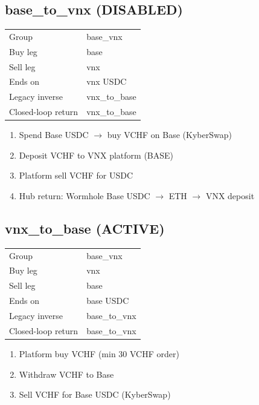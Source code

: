 \documentclass[11pt,a4paper]{article}
\begin{document}
\subsection*{\textcolor{warnred}{base\_to\_vnx} (DISABLED)}
\begin{tabular}{@{}ll@{}}
Group & base\_vnx \\
Buy leg & base \\
Sell leg & vnx \\
Ends on & vnx USDC \\
Legacy inverse & vnx\_to\_base \\
Closed-loop return & vnx\_to\_base \\
\end{tabular}
\begin{enumerate}[nosep,leftmargin=*]
\item Spend Base USDC $\rightarrow$ buy VCHF on Base (KyberSwap)
\item Deposit VCHF to VNX platform (BASE)
\item Platform sell VCHF for USDC
\item Hub return: Wormhole Base USDC $\rightarrow$ ETH $\rightarrow$ VNX deposit
\end{enumerate}
\subsection*{\textcolor{okgreen}{vnx\_to\_base} (ACTIVE)}
\begin{tabular}{@{}ll@{}}
Group & base\_vnx \\
Buy leg & vnx \\
Sell leg & base \\
Ends on & base USDC \\
Legacy inverse & base\_to\_vnx \\
Closed-loop return & base\_to\_vnx \\
\end{tabular}
\begin{enumerate}[nosep,leftmargin=*]
\item Platform buy VCHF (min 30 VCHF order)
\item Withdraw VCHF to Base
\item Sell VCHF for Base USDC (KyberSwap)
\end{enumerate}
\end{document}
